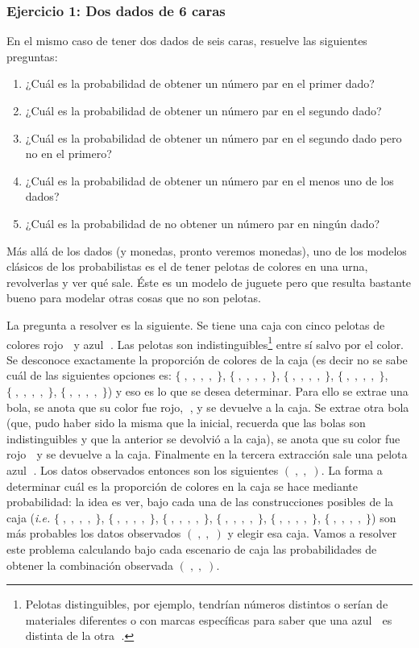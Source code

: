 \documentclass[
]{book}
\providecommand{\tightlist}{%
  \setlength{\itemsep}{0pt}\setlength{\parskip}{0pt}}
\newenvironment{Ejercicio}
{\begin{mdframed}[
  linecolor=ejerciciocolor,
  skipabove=12pt,
  skipbelow=12pt,
  roundcorner=20pt,
  splittopskip=2\topsep]}
{\end{mdframed}}
\begin{document}
\begin{Ejercicio}
\hypertarget{ejercicio-1-dos-dados-de-6-caras}{%
\subsubsection{Ejercicio 1: Dos dados de 6
caras}\label{ejercicio-1-dos-dados-de-6-caras}}

En el mismo caso de tener dos dados de seis caras, resuelve las
siguientes preguntas:

\begin{enumerate}
\def\labelenumi{\alph{enumi}.}
\tightlist
\item
  ¿Cuál es la probabilidad de obtener un número par en el primer dado?
\item
  ¿Cuál es la probabilidad de obtener un número par en el segundo dado?
\item
  ¿Cuál es la probabilidad de obtener un número par en el segundo dado
  pero no en el primero?
\item
  ¿Cuál es la probabilidad de obtener un número par en el menos uno de
  los dados?
\item
  ¿Cuál es la probabilidad de no obtener un número par en ningún dado?
\end{enumerate}
\end{Ejercicio}

Más allá de los dados (y monedas, pronto veremos monedas), uno de los modelos clásicos de los probabilistas es el de tener pelotas de colores en una urna, revolverlas y ver qué sale. Éste es un modelo de juguete pero que resulta bastante bueno para modelar otras cosas que no son pelotas.

La pregunta a resolver es la siguiente. Se tiene una caja con cinco pelotas de colores rojo 🔴 y azul 🔵. Las pelotas son indistinguibles\footnote{Pelotas distinguibles, por ejemplo, tendrían números distintos o serían de materiales diferentes o con marcas específicas para saber que una azul 🔵 es distinta de la otra 🔵.} entre sí salvo por el color. Se desconoce exactamente la proporción de colores de la caja (es decir no se sabe cuál de las siguientes opciones es: \(\{ 🔴, 🔴, 🔴, 🔴, 🔴\}\), \(\{ 🔴, 🔴, 🔴, 🔴, 🔵\}\), \(\{ 🔴, 🔴, 🔴, 🔵, 🔵\}\), \(\{ 🔴, 🔴, 🔵, 🔵, 🔵\}\), \(\{ 🔴, 🔵, 🔵, 🔵, 🔵\}\), \(\{ 🔵, 🔵, 🔵, 🔵, 🔵\}\)) y eso es lo que se desea determinar. Para ello se extrae una bola, se anota que su color fue rojo, 🔴, y se devuelve a la caja. Se extrae otra bola (que, pudo haber sido la misma que la inicial, recuerda que las bolas son indistinguibles y que la anterior se devolvió a la caja), se anota que su color fue rojo 🔴 y se devuelve a la caja. Finalmente en la tercera extracción sale una pelota azul 🔵. Los datos observados entonces son los siguientes \(( 🔴, 🔴, 🔵)\). La forma a determinar cuál es la proporción de colores en la caja se hace mediante probabilidad: la idea es ver, bajo cada una de las construcciones posibles de la caja (\emph{i.e.} \(\{ 🔴, 🔴, 🔴, 🔴, 🔴\}\), \(\{ 🔴, 🔴, 🔴, 🔴, 🔵\}\), \(\{ 🔴, 🔴, 🔴, 🔵, 🔵\}\), \(\{ 🔴, 🔴, 🔵, 🔵, 🔵\}\), \(\{ 🔴, 🔵, 🔵, 🔵, 🔵\}\), \(\{ 🔵, 🔵, 🔵, 🔵, 🔵\}\)) son más probables los datos observados \(( 🔴, 🔴, 🔵)\) y elegir esa caja. Vamos a resolver este problema calculando bajo cada escenario de caja las probabilidades de obtener la combinación observada \(( 🔴, 🔴, 🔵)\).
\end{document}

